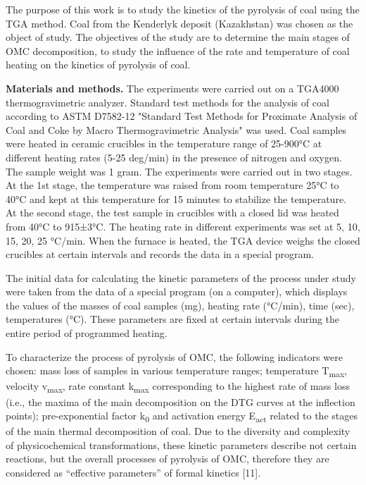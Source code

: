The purpose of this work is to study the kinetics of the pyrolysis of
coal using the TGA method. Coal from the Kenderlyk deposit (Kazakhstan)
was chosen as the object of study. The objectives of the study are to
determine the main stages of OMC decomposition, to study the influence
of the rate and temperature of coal heating on the kinetics of pyrolysis
of coal.

\textbf{Materials and methods.} The experiments were carried out on a
TGA4000 thermogravimetric analyzer. Standard test methods for the
analysis of coal according to ASTM D7582-12 "Standard Test Methods for
Proximate Analysis of Coal and Coke by Macro Thermogravimetric Analysis"
was used. Coal samples were heated in ceramic crucibles in the
temperature range of 25-900°C at different heating rates (5-25 deg/min)
in the presence of nitrogen and oxygen. The sample weight was 1 gram.
The experiments were carried out in two stages. At the 1st stage, the
temperature was raised from room temperature 25°C to 40°C and kept at
this temperature for 15 minutes to stabilize the temperature. At the
second stage, the test sample in crucibles with a closed lid was heated
from 40°C to 915±3°C. The heating rate in different experiments was set
at 5, 10, 15, 20, 25 °C/min. When the furnace is heated, the TGA device
weighs the closed crucibles at certain intervals and records the data in
a special program.

The initial data for calculating the kinetic parameters of the process
under study were taken from the data of a special program (on a
computer), which displays the values of the masses of coal samples (mg),
heating rate (°C/min), time (sec), temperatures (°C). These parameters
are fixed at certain intervals during the entire period of programmed
heating.

To characterize the process of pyrolysis of OMC, the following
indicators were chosen: mass loss of samples in various temperature
ranges; temperature T\textsubscript{max}, velocity v\textsubscript{max},
rate constant k\textsubscript{max} corresponding to the highest rate of
mass loss (i.e., the maxima of the main decomposition on the DTG curves
at the inflection points); pre-exponential factor k\textsubscript{0} and
activation energy E\textsubscript{act} related to the stages of the main
thermal decomposition of coal. Due to the diversity and complexity of
physicochemical transformations, these kinetic parameters describe not
certain reactions, but the overall processes of pyrolysis of OMC,
therefore they are considered as ``effective parameters'' of formal
kinetics {[}11{]}.

